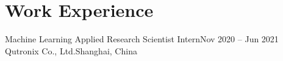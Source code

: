 \section{Work Experience}

\begin{resumeEntries}
  \resumeEntry
    {Machine Learning Applied Research Scientist Intern}{Nov 2020 -- Jun 2021}
    {Qutronix Co., Ltd.}{Shanghai, China}
\end{resumeEntries}


